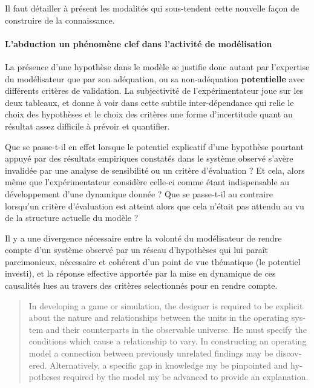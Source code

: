 Il faut détailler à présent les modalités qui sous-tendent cette nouvelle façon de construire de la connaissance.

\paragraph{L'abduction un phénomène clef dans l'activité de modélisation}
\label{p:abduction}


La présence d'une hypothèse dans le modèle se justifie donc autant par l'expertise du modélisateur que par son adéquation, ou sa non-adéquation \textbf{potentielle} avec différents critères de validation. La subjectivité de l'expérimentateur joue sur les deux tableaux, et donne à voir dans cette subtile inter-dépendance qui relie le choix des hypothèses et le choix des critères une forme d'incertitude quant au résultat assez difficile à prévoir et quantifier.

Que se passe-t-il en effet lorsque le potentiel explicatif d'une hypothèse pourtant appuyé par des résultats empiriques constatés dans le système observé s'avère invalidée par une analyse de sensibilité ou un critère d'évaluation ? Et cela, alors même que l'expérimentateur considère celle-ci comme étant indispensable au développement d'une dynamique donnée ? Que se passe-t-il au contraire lorsqu'un critère d'évaluation est atteint alors que cela n'était pas attendu au vu de la structure actuelle du modèle ?


Il y a une divergence nécessaire entre la volonté du modélisateur de rendre compte d'un système observé par un réseau d'hypothèses qui lui paraît parcimonieux, nécessaire et cohérent d'un point de vue thématique (le potentiel investi), et la réponse effective apportée par la mise en dynamique de ces causalités lues au travers des critères selectionnés pour en rendre compte. %

\foreignblockquote{english}[{\cite[219]{Hermann1967}}]{In developing a game or simulation, the designer is required to be explicit about the nature and relationships between the units in the operating system and their counterparts in the observable universe. He must specify the conditions which cause a relationship to vary. In constructing an operating model a connection between previously unrelated findings may be discovered. Alternatively, a specific gap in knowledge my be pinpointed and hypotheses required by the model my be advanced to provide an explanation.}

